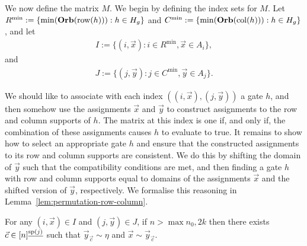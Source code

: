 \documentclass[../paper.tex]{subfiles}
\begin{document}
We now define the matrix $M$. We begin by defining the index sets for $M$. Let
$R^{\min} := \{\min (\text{\textbf{Orb}}(\text{row}(h))) : h \in H_g\}$ and $C^{\min} := \{ \min
(\text{\textbf{Orb}} (\text{col}(h))) : h \in H_g\}$, and let
\begin{align*}
	I := \{(i, \vec{x}): i \in R^{\min}, \vec{x} \in A_i\}, 
\end{align*}
and
\begin{align*}
	J := \{(j, \vec{y}): j \in C^{\min}, \vec{y} \in A_j\}. 
\end{align*}

We should like to associate with each index $((i, \vec{x}), (j, \vec{y}))$ a
gate $h$, and then somehow use the assignments $\vec{x}$ and $\vec{y}$ to
construct assignments to the row and column supports of $h$. The matrix at this
index is one if, and only if, the combination of these assignments causes $h$ to
evaluate to true. It remains to show how to select an appropriate gate $h$ and
ensure that the constructed assignments to its row and column supports are
consistent. We do this by shifting the domain of $\vec{y}$ such that the
compatibility conditions are met, and then finding a gate $h$ with row and
column supports equal to domains of the assignments $\vec{x}$ and the shifted
version of $\vec{y}$, respectively. We formalise this reasoning in
Lemma~\ref{lem:permutation-row-column}.

\begin{lem}
	\label{lem:permutation-row-column}
	For any $(i, \vec{x}) \in I$ and $(j, \vec{y}) \in J$, if $n > \max{n_0, 2k}$
  then there exists $\vec{c} \in [n]^{\underline{\text{sp}(j)}}$ such that
  $\vec{y}_{\vec{c}} \sim \eta$ and $\vec{x} \sim \vec{y}_{\vec{c}}$.
\end{lem}
\end{document}
